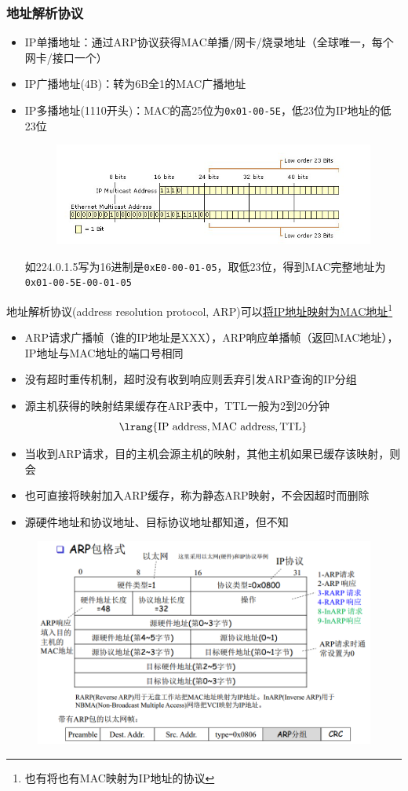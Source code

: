 \subsubsection{地址解析协议}
\begin{itemize}
	\item IP单播地址：通过ARP协议获得MAC单播/网卡/烧录地址（全球唯一，每个网卡/接口一个）
	\item IP广播地址(4B)：转为6B全1的MAC广播地址
	\item IP多播地址(1110开头)：MAC的高25位为\verb'0x01-00-5E'，低23位为IP地址的低23位
	\begin{figure}[H]
		\centering
		\includegraphics[width=0.8\linewidth]{fig/ip_mac.png}
	\end{figure}
	如224.0.1.5写为16进制是\verb'0xE0-00-01-05'，取低23位，得到MAC完整地址为\verb'0x01-00-5E-00-01-05'
\end{itemize}

地址解析协议(address resolution protocol, ARP)可以\underline{将IP地址映射为MAC地址}\footnote{也有将也有MAC映射为IP地址的协议}
\begin{itemize}
	\item ARP请求广播帧（谁的IP地址是XXX），ARP响应单播帧（返回MAC地址），IP地址与MAC地址的端口号相同
	\item 没有超时重传机制，超时没有收到响应则丢弃引发ARP查询的IP分组
	\item 源主机获得的映射结果缓存在ARP表中，TTL一般为2到20分钟
	\[\lrang{\text{IP address},\text{MAC address},\text{TTL}}\]
	\item 当收到ARP请求，目的主机会源主机的映射，其他主机如果已缓存该映射，则会
	\item 也可直接将映射加入ARP缓存，称为静态ARP映射，不会因超时而删除
	\item 源硬件地址和协议地址、目标协议地址都知道，但不知
\end{itemize}
\begin{figure}[H]
	\centering
	\includegraphics[width=0.7\linewidth]{fig/ARP.PNG}
\end{figure}

